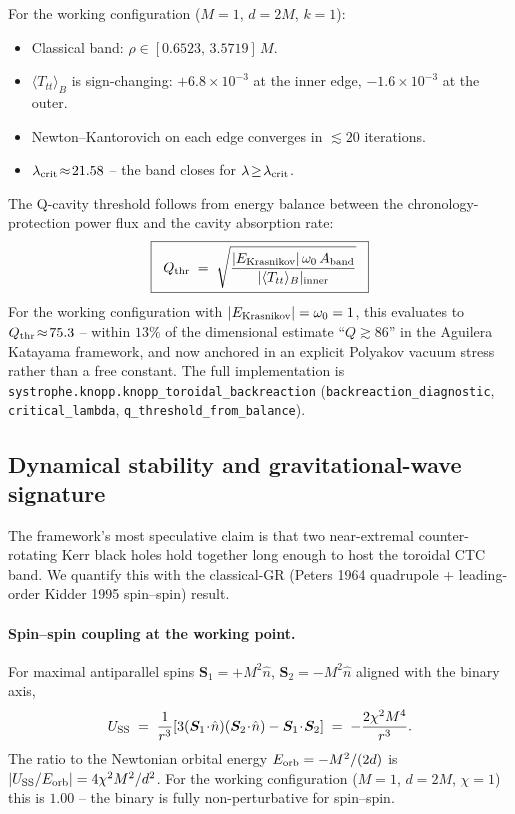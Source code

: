 \documentclass[11pt,a4paper]{article}
\begin{document}
For the working configuration ($M\!=\!1$, $d\!=\!2M$, $k\!=\!1$):
\begin{itemize}[leftmargin=*]
\item Classical band: $\rho\in[0.6523,\,3.5719]\,M$.
\item $\langle T_{tt}\rangle_{B}$ is sign-changing: $+6.8\!\times\!10^{-3}$ at the inner edge, $-1.6\!\times\!10^{-3}$ at the outer.
\item Newton--Kantorovich on each edge converges in $\lesssim\!20$ iterations.
\item $\lambda_{\rm crit}\!\approx\!21.58$ -- the band closes for $\lambda\!\geq\!\lambda_{\rm crit}$.
\end{itemize}

The Q-cavity threshold follows from energy balance between the chronology-protection power flux and the cavity absorption rate:
\begin{equation}
\boxed{\;\;Q_{\rm thr}\;=\;\sqrt{\frac{|E_{\rm Krasnikov}|\,\omega_{0}\,A_{\rm band}}{|\langle T_{tt}\rangle_{B}|_{\rm inner}}}\;\;}
\end{equation}
For the working configuration with $|E_{\rm Krasnikov}|=\omega_{0}=1$, this evaluates to $Q_{\rm thr}\!\approx\!75.3$ -- within $13\%$ of the dimensional estimate ``$Q\!\gtrsim\!86$'' in the Aguilera Katayama framework, and now anchored in an explicit Polyakov vacuum stress rather than a free constant. The full implementation is \texttt{systrophe.knopp.knopp\_toroidal\_backreaction} (\texttt{backreaction\_diagnostic}, \texttt{critical\_lambda}, \texttt{q\_threshold\_from\_balance}).

\subsection{Dynamical stability and gravitational-wave signature}\label{ssec:toroidal_stability}

The framework's most speculative claim is that two near-extremal counter-rotating Kerr black holes hold together long enough to host the toroidal CTC band. We quantify this with the classical-GR (Peters 1964 quadrupole + leading-order Kidder 1995 spin--spin) result.

\paragraph{Spin--spin coupling at the working point.} For maximal antiparallel spins $\bm{S}_{1}=+M^{2}\hat{n}$, $\bm{S}_{2}=-M^{2}\hat{n}$ aligned with the binary axis,
\begin{equation}
U_{\rm SS}\;=\;\frac{1}{r^{3}}\!\left[3(\bm{S}_{1}\!\cdot\!\hat{n})(\bm{S}_{2}\!\cdot\!\hat{n})-\bm{S}_{1}\!\cdot\!\bm{S}_{2}\right]
\;=\;-\frac{2\chi^{2}M^{4}}{r^{3}}.
\end{equation}
The ratio to the Newtonian orbital energy $E_{\rm orb}=-M^{2}/(2d)$ is $|U_{\rm SS}/E_{\rm orb}|=4\chi^{2}M^{2}/d^{2}$. For the working configuration ($M\!=\!1$, $d\!=\!2M$, $\chi\!=\!1$) this is $\mathbf{1.00}$ -- the binary is fully non-perturbative for spin--spin.
\end{document}
